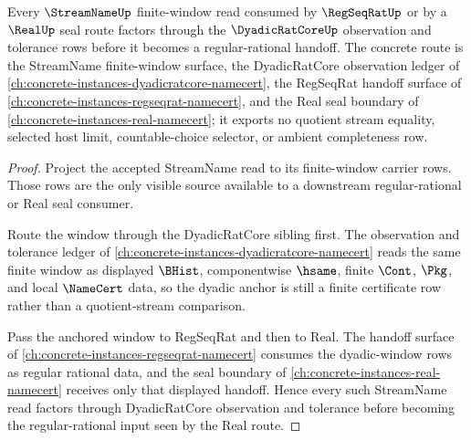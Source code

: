 \begin{theorem}
\label{thm:streamname-dyadicratcore-window-anchor}
Every $\StreamNameUp$ finite-window read consumed by $\RegSeqRatUp$ or by a $\RealUp$ seal route factors through the $\DyadicRatCoreUp$ observation and tolerance rows before it becomes a regular-rational handoff. The concrete route is the StreamName finite-window surface, the DyadicRatCore observation ledger of \autoref{ch:concrete-instances-dyadicratcore-namecert}, the RegSeqRat handoff surface of \autoref{ch:concrete-instances-regseqrat-namecert}, and the Real seal boundary of \autoref{ch:concrete-instances-real-namecert}; it exports no quotient stream equality, selected host limit, countable-choice selector, or ambient completeness row.
\end{theorem}
\begin{proof}
Project the accepted StreamName read to its finite-window carrier rows. Those rows are the only visible source available to a downstream regular-rational or Real seal consumer.

Route the window through the DyadicRatCore sibling first. The observation and tolerance ledger of \autoref{ch:concrete-instances-dyadicratcore-namecert} reads the same finite window as displayed $\BHist$, componentwise $\hsame$, finite $\Cont$, $\Pkg$, and local $\NameCert$ data, so the dyadic anchor is still a finite certificate row rather than a quotient-stream comparison.

Pass the anchored window to RegSeqRat and then to Real. The handoff surface of \autoref{ch:concrete-instances-regseqrat-namecert} consumes the dyadic-window rows as regular rational data, and the seal boundary of \autoref{ch:concrete-instances-real-namecert} receives only that displayed handoff. Hence every such StreamName read factors through DyadicRatCore observation and tolerance before becoming the regular-rational input seen by the Real route.
\end{proof}
